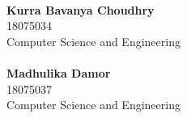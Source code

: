 \documentclass[a4paper, 12pt, oneside]{book}
\begin{document}
\begin{titlepage}
\begin{minipage}[t]{0.47\textwidth}
    \end{minipage}
    \hfill
    \begin{minipage}[t]{0.47\textwidth}\raggedleft
        \vspace{9}
    	{\large{\\ \textbf{Kurra Bavanya Choudhry} \\18075034\\Computer Science and Engineering}}
	\vspace{1mm}\\
    	{\large{\\ \textbf{Madhulika Damor} \\18075037\\Computer Science and Engineering}}
 	\vspace{1mm}\\
    \end{minipage}
    
    \vspace{20mm}
    \vspace{20mm}
    


\end{titlepage}
\end{document}
